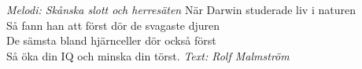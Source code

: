 {\footnotesize\textit{Melodi: Skånska slott och herresäten}}
\vspace{10pt}
När Darwin studerade liv i naturen\\
Så fann han att först dör de svagaste djuren\\
De sämsta bland hjärnceller dör också först\\
Så öka din IQ och minska din törst.
\vspace{10pt}
{\footnotesize\textit{Text: Rolf Malmström}}
